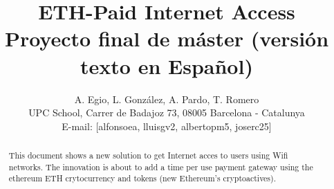 \documentclass[9pt,oneside]{amsart}
\title{ETH-Paid Internet Access\\ {\smaller \textbf{Proyecto final de máster (versi\'on texto en Español)}}}
\author{
    A. Egio, L. González, A. Pardo, T. Romero\\
    UPC School, Carrer de Badajoz 73, 08005 Barcelona - Catalunya\\
    E-mail: [alfonsoea, lluisgv2, albertopm5, joserc25]
}
\begin{document}
\pagecolor{pagecolor}


\begin{abstract}
  This document shows a new solution to get Internet acces to users
  using Wifi networks. The innovation is about to add a time
  per use payment gateway
  using the ethereum ETH crytocurrency and
  tokens (new Ethereum's cryptoactives).
\end{abstract}

\maketitle

\tableofcontents
\end{document}
